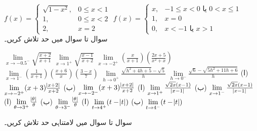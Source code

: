 $f(x)=\begin{cases}\sqrt{1-x^2},&0\le x<1\\ 1,&0\le x<2\\ 2,&x=2  \end{cases}$
$f(x)=\begin{cases}x,&-1\le x<0\,\, \text{یا}\,\, 0<x\le 1\\ 1,& x=0\\ 0,&x<-1 \,\,\text{یا}\,\, x>1  \end{cases}$
 سوال  تا سوال  میں حد تلاش کریں۔

$\lim\limits_{x\to -0.5^-}\sqrt{\tfrac{x+2}{x+1}}$
$\lim\limits_{x\to 1^+}\sqrt{\tfrac{x-1}{x+2}}$
$\lim\limits_{x\to -2^+}(\tfrac{x}{x+1})(\tfrac{2x+5}{x^2+x})$
$\lim\limits_{x\to 1^-}(\tfrac{1}{x+1})(\tfrac{x+6}{x})(\tfrac{3-x}{7})$
$\lim\limits_{h\to 0^+}\tfrac{\sqrt{h^2+4h+5}-\sqrt{5}}{h}$
$\lim\limits_{h\to 0^-}\tfrac{\sqrt{6}-\sqrt{5h^2+11h+6}}{h}$
(ا)\quad
$\lim\limits_{x\to -2^+}(x+3)\tfrac{\abs{x+2}}{x+2}$\quad
(ب)\quad
$\lim\limits_{x\to -2^-}(x+3)\tfrac{\abs{x+2}}{x+2}$
(ا)\quad
$\lim\limits_{x\to 1^+}\tfrac{\sqrt{2x}(x-1)}{\abs{x-1}}$\quad
(ب)\quad
$\lim\limits_{x\to 1^-}\tfrac{\sqrt{2x}(x-1)}{\abs{x-1}}$
(ا)\quad
$\lim\limits_{\theta\to 3^+}\tfrac{\abs{\theta}}{\theta}$\quad
(ب)\quad
$\lim\limits_{\theta\to 3^-}\tfrac{\abs{\theta}}{\theta}$
(ا)\quad
$\lim\limits_{t\to 4^+} (t-\abs{t})$\quad
(ب)\quad
$\lim\limits_{t\to 4^-} (t-\abs{t})$

 سوال  تا سوال  میں لامتناہی حد تلاش کریں۔

